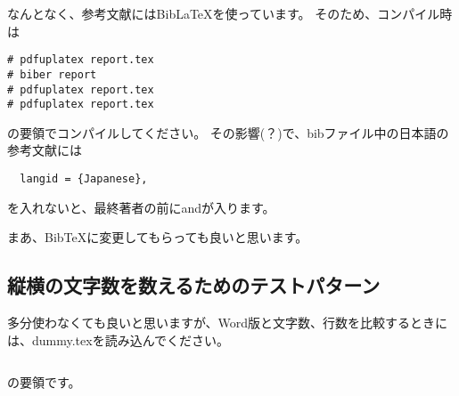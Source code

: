 \documentclass[uplatex,dvipdfmx,11pt]{jsarticle}
\begin{document}
なんとなく、参考文献にはBibLaTeXを使っています。
そのため、コンパイル時は
\begin{verbatim}
# pdfuplatex report.tex
# biber report
# pdfuplatex report.tex
# pdfuplatex report.tex
\end{verbatim}
の要領でコンパイルしてください。
その影響(？)で、bibファイル中の日本語の参考文献には
\begin{verbatim}
  langid = {Japanese},
\end{verbatim}
を入れないと、最終著者の前にandが入ります。

まあ、BibTeXに変更してもらっても良いと思います。


\subsection{縦横の文字数を数えるためのテストパターン}
多分使わなくても良いと思いますが、Word版と文字数、行数を比較するときには、dummy.texを読み込んでください。
\begin{verbatim}

\end{verbatim}
の要領です。

\printbibliography[title=参考文献]
\end{document}
